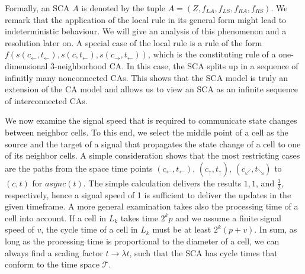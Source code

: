 \documentclass[pre,amssymb,showpacs,showkeys,preprint]{revtex4}
\begin{document}
Formally, an SCA $A$ is denoted by the tuple $A = (Z, f_{LA}, f_{LS}, f_{RA}, f_{RS})$.
We remark that the application of the local rule in its general form might lead to indeterministic behaviour.
We will give an analysis of this phenomenon and a resolution later on.
A special case of the local rule is a rule of the form
$f(s(c_\leftarrow, t_\leftarrow), s(c, t_\leftarrow), s(c_\rightarrow, t_\leftarrow))$,
which is the constituting rule of a one-dimensional 3-neighborhood CA.
In this case, the SCA splits up in a sequence of infinitly many nonconnected CAs.
This shows that the SCA model is truly an extension of the CA model and allows us to
view an SCA as an infinite sequence of interconnected CAs.

We now examine the signal speed that is required to communicate state changes between neighbor cells.
To this end, we select the middle point of a cell as the source and the target of a
signal that propagates the state change of a cell to one of its neighbor cells.
A simple consideration shows that the most restricting cases are the paths from the space time points
$(c_\leftarrow, t_\leftarrow)$, $(c_\uparrow, t_\uparrow)$, $(c_\swarrow, t_\searrow)$ to $(c,t)$ for $\mathit{async}(t)$.
The simple calculation delivers the results $1,1$, and $\frac{1}{2}$, respectively,
hence a signal speed of 1 is sufficient to deliver the updates in the given timeframe.
A more general examination takes also the processing time of a cell into account.
If a cell in $L_k$ takes time $2^k p$ and we assume a finite signal speed of $v$,
the cycle time of a cell in $L_k$ must be at least $2^k (p + v)$.
In sum, as long as the processing time is proportional to the diameter of a cell,
we can always find a scaling factor $t \rightarrow \lambda t$, such that
the SCA has cycle times that conform to the time space $\mathcal{T}$.
\end{document}
